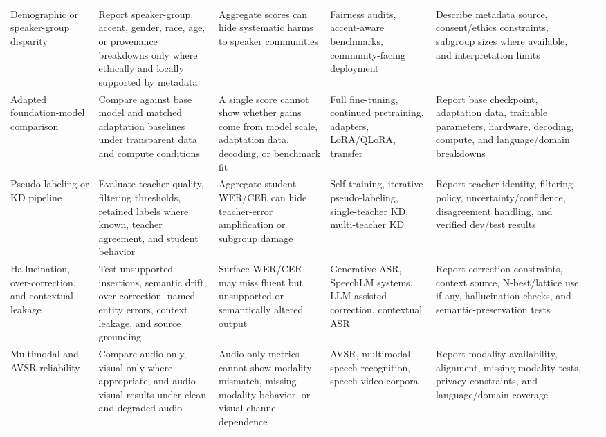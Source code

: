 \documentclass[pdflatex,sn-basic]{sn-jnl}
\theoremstyle{thmstyleone}
\theoremstyle{thmstyletwo}
\theoremstyle{thmstylethree}
\begin{document}
\begin{table}[htbp]
\begin{tabularx}{\textwidth}{YYYYYY}
Demographic or speaker-group disparity & Report speaker-group, accent, gender, race, age, or provenance breakdowns only where ethically and locally supported by metadata & Aggregate scores can hide systematic harms to speaker communities & Fairness audits, accent-aware benchmarks, community-facing deployment & Describe metadata source, consent/ethics constraints, subgroup sizes where available, and interpretation limits & \citep{koenecke2020racialdisparities,liu2021casualconversations,olatunji2023_afrispeech200} \\
Adapted foundation-model comparison & Compare against base model and matched adaptation baselines under transparent data and compute conditions & A single score cannot show whether gains come from model scale, adaptation data, decoding, or benchmark fit & Full fine-tuning, continued pretraining, adapters, LoRA/QLoRA, transfer & Report base checkpoint, adaptation data, trainable parameters, hardware, decoding, compute, and language/domain breakdowns & \citep{babu22_interspeech,pmlr-v202-radford23a,pratap2024mms,qian24_interspeech} \\
Pseudo-labeling or KD pipeline & Evaluate teacher quality, filtering thresholds, retained labels where known, teacher agreement, and student behavior & Aggregate student WER/CER can hide teacher-error amplification or subgroup damage & Self-training, iterative pseudo-labeling, single-teacher KD, multi-teacher KD & Report teacher identity, filtering policy, uncertainty/confidence, disagreement handling, and verified dev/test results & \citep{park20d_interspeech,khurana2020dust,leal21_interspeech,bhogale24_interspeech} \\
Hallucination, over-correction, and contextual leakage & Test unsupported insertions, semantic drift, over-correction, named-entity errors, context leakage, and source grounding & Surface WER/CER may miss fluent but unsupported or semantically altered output & Generative ASR, SpeechLM systems, LLM-assisted correction, contextual ASR & Report correction constraints, context source, N-best/lattice use if any, hallucination checks, and semantic-preservation tests & \citep{koenecke2024carelesswhisper,koudounas2025shallow,wang2025contextasrbench,ma2024asrerrorcorrection} \\
Multimodal and AVSR reliability & Compare audio-only, visual-only where appropriate, and audio-visual results under clean and degraded audio & Audio-only metrics cannot show modality mismatch, missing-modality behavior, or visual-channel dependence & AVSR, multimodal speech recognition, speech-video corpora & Report modality availability, alignment, missing-modality tests, privacy constraints, and language/domain coverage & \citep{shi2022avhubert,shi2022robustavsr,anwar23_interspeech} \\

\end{tabularx}
\end{table}
\end{document}
